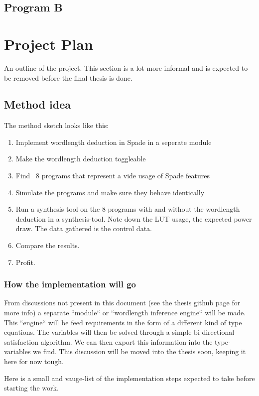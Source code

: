 \documentclass[msc,lith,english]{liuthesis}
\begin{document}
\section{Program B}

\chapter{Project Plan}
An outline of the project. This section is a lot more informal and is expected to be removed before the final thesis is done.

\section{Method idea}
The method sketch looks like this:
\begin{enumerate}
  \item Implement wordlength deduction in Spade in a seperate module
  \item Make the wordlength deduction toggleable
  \item Find ~8 programs that represent a vide usage of Spade features
  \item Simulate the programs and make sure they behave identically
  \item Run a synthesis tool on the 8 programs with and without the wordlength deduction in a synthesis-tool. Note down the LUT usage, the expected power draw. The data gathered is the control data.
  \item Compare the results.
  \item Profit.
\end{enumerate}

\subsection{How the implementation will go}
From discussions not present in this document (see the thesis github page for more info) a separate ``module`` or ``wordlength inference engine`` will be made. This ``engine`` will be feed requirements in the form of a different kind of type equations. The variables will then be solved through a simple bi-directional satisfaction algorithm. We can then export this information into the type-variables we find. This discussion will be moved into the thesis soon, keeping it here for now tough. 

Here is a small and vauge-list of the implementation steps expected to take before starting the work.
\end{document}
